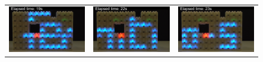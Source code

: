 {\begin{figure}[h!]
\begin{tabular}{c c c}
			\includegraphics[width=\subFigureWidth]{images/time-synchronization/scroller/sync_19s}  &
			\includegraphics[width=\subFigureWidth]{images/time-synchronization/scroller/sync_22s} &
			\includegraphics[width=\subFigureWidth]{images/time-synchronization/scroller/sync_23s}  \\
			

\end{tabular}
\end{figure}}
